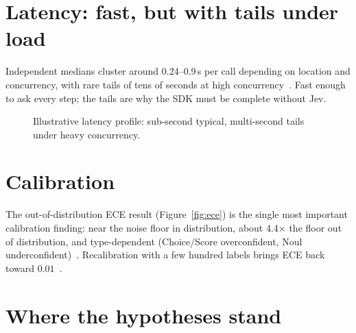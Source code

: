\section{Latency: fast, but with tails under load}

Independent medians cluster around 0.24--0.9\,s per call depending on location and
concurrency, with rare tails of tens of seconds at high concurrency~\citep{aman_kumar}. Fast
enough to ask every step; the tails are why the SDK must be complete without Jev.

\begin{figure}[h]\centering
{}
\caption{Illustrative latency profile: sub-second typical, multi-second tails under heavy
concurrency.~\citep{aman_kumar}}
\label{fig:latency}
\end{figure}

\section{Calibration}

The out-of-distribution ECE result (Figure~\ref{fig:ece}) is the single most important
calibration finding: near the noise floor in distribution, about 4.4\(\times\) the floor out
of distribution, and type-dependent (Choice/Score overconfident, Noul
underconfident)~\citep{jev_ood_calibration}. Recalibration with a few hundred labels brings
ECE back toward $0.01$~\citep{jev_calibration_anthus}.

\section{Where the hypotheses stand}

